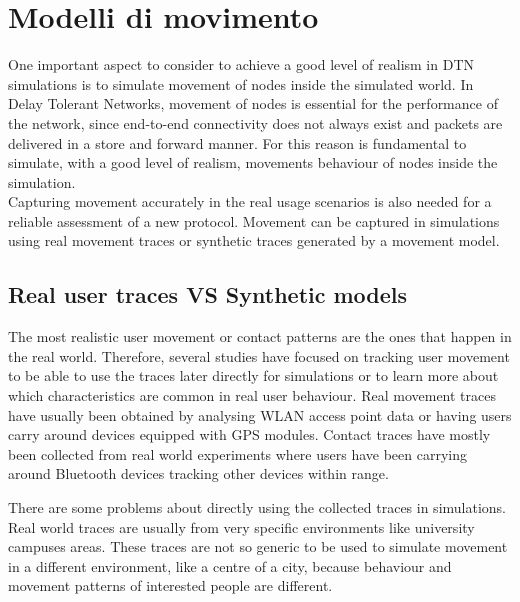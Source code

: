 
\chapter{Modelli di movimento}\label{movimento} %





One important aspect to consider to achieve a good level of realism in DTN simulations is to simulate movement of nodes inside the simulated world. In Delay Tolerant Networks, movement of nodes is essential for the performance of the network, since end-to-end connectivity does not always exist and packets are delivered in a store and forward manner. For this reason is fundamental to simulate, with a good level of realism, movements behaviour of nodes inside the simulation.
\\

Capturing movement accurately in the real usage scenarios is also needed for a reliable assessment of a new protocol. Movement can be captured in simulations using real movement traces or synthetic traces generated by a movement model.

\section{Real user traces VS Synthetic models}
The most realistic user movement or contact patterns are the ones that happen in the real world. Therefore, several studies have focused on tracking user movement to be able to use the traces later directly for simulations or to learn more about which characteristics are common in real user behaviour.
Real movement traces have usually been obtained by analysing WLAN access point data or
having users carry around devices equipped with GPS modules. Contact traces have
mostly been collected from real world experiments where users have been carrying
around Bluetooth devices tracking other devices within range.

There are some problems about directly using the collected traces in simulations. Real world traces are usually from very specific environments like university campuses areas. These traces are not so generic to be used to simulate movement in a different environment, like a centre of a city, because behaviour and movement patterns of interested people are different. \\


